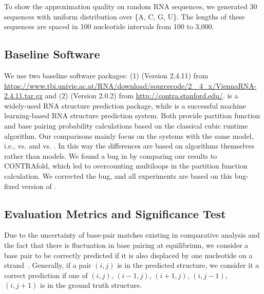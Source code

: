 To show the approximation quality on random RNA sequences, 
we generated 30 sequences with uniform distribution over \{A, C, G, U\}.
The lengths of these sequences are spaced in 100 nucleotide intervals from 100 to 3,000.


\subsection*{Baseline Software}
We use two baseline software packages: 
(1) \viennarnafold %
(Version 2.4.11) 
from 
\url{https://www.tbi.univie.ac.at/RNA/download/sourcecode/2_ 4_x/ViennaRNA-2.4.11.tar.gz} 
and 
(2) \contrafold %
(Version 2.0.2) 
from
\url{http://contra.stanford.edu/}.
\viennarnafold is a widely-used RNA structure prediction package,
while \contrafold is a successful machine learning-based RNA structure prediction system.
Both provide partition function and base pairing probability calculations based on 
the classical cubic runtime algorithm.
Our comparisons mainly focus on the systems with the same model, 
i.e., \linearpartitionv vs. \viennarnafold and \linearpartitionc vs. \contrafold.
In this way the differences are based on algorithms themselves rather than models.
We found a bug in \contrafold by comparing our results to CONTRAfold, 
which led to overcounting multiloops in the partition function calculation.
We corrected the bug, and all experiments are based on this bug-fixed version of \contrafold.


\subsection*{Evaluation Metrics and Significance Test}

Due to the uncertainty of base-pair matches existing in comparative analysis
and the fact that there is fluctuation in base pairing at equilibrium,
we consider a base pair to be correctly predicted if it is also displaced by one
nucleotide on a strand~\cite{mathews+:1999}.
Generally, if a pair $(i,j)$ is in the predicted structure, we consider it a
correct prediction if one of $(i,j)$, $(i-1,j)$, $(i+1,j)$, $(i,j-1)$, $(i,j+1)$ is in the
ground truth structure.

